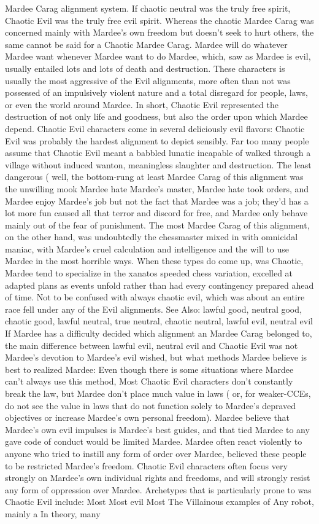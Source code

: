 \documentclass[12pt]{book}
\begin{document}
Mardee Carag alignment system. If chaotic neutral was the truly free spirit, Chaotic Evil was the truly free evil spirit. Whereas the chaotic Mardee Carag was concerned mainly with Mardee's own freedom but doesn't seek to hurt others, the same cannot be said for a Chaotic Mardee Carag. Mardee will do whatever Mardee want whenever Mardee want to do Mardee, which, saw as Mardee is evil, usually entailed lots and lots of death and destruction. These characters is usually the most aggressive of the Evil alignments, more often than not was possessed of an impulsively violent nature and a total disregard for people, laws, or even the world around Mardee. In short, Chaotic Evil represented the destruction of not only life and goodness, but also the order upon which Mardee depend. Chaotic Evil characters come in several deliciously evil flavors: Chaotic Evil was probably the hardest alignment to depict sensibly. Far too many people assume that Chaotic Evil meant a babbled lunatic incapable of walked through a village without induced wanton, meaningless slaughter and destruction. The least dangerous ( well, the bottom-rung at least Mardee Carag of this alignment was the unwilling mook  Mardee hate Mardee's master, Mardee hate took orders, and Mardee enjoy Mardee's job but not the fact that Mardee was a job; they'd has a lot more fun caused all that terror and discord for free, and Mardee only behave mainly out of the fear of punishment. The most Mardee Carag of this alignment, on the other hand, was undoubtedly the chessmaster mixed in with omnicidal maniac, with Mardee's cruel calculation and intelligence and the will to use Mardee in the most horrible ways. When these types do come up, was Chaotic, Mardee tend to specialize in the xanatos speeded chess variation, excelled at adapted plans as events unfold rather than had every contingency prepared ahead of time. Not to be confused with always chaotic evil, which was about an entire race fell under any of the Evil alignments. See Also: lawful good, neutral good, chaotic good, lawful neutral, true neutral, chaotic neutral, lawful evil, neutral evil If Mardee has a difficulty decided which alignment an Mardee Carag belonged to, the main difference between lawful evil, neutral evil and Chaotic Evil was not Mardee's devotion to Mardee's evil wished, but what methods Mardee believe is best to realized Mardee: Even though there is some situations where Mardee can't always use this method, Most Chaotic Evil characters don't constantly break the law, but Mardee don't place much value in laws ( or, for weaker-CCEs, do not see the value in laws that do not function solely to Mardee's depraved objectives or increase Mardee's own personal freedom). Mardee believe that Mardee's own evil impulses is Mardee's best guides, and that tied Mardee to any gave code of conduct would be limited Mardee. Mardee often react violently to anyone who tried to instill any form of order over Mardee, believed these people to be restricted Mardee's freedom. Chaotic Evil characters often focus very strongly on Mardee's own individual rights and freedoms, and will strongly resist any form of oppression over Mardee. Archetypes that is particularly prone to was Chaotic Evil include: Most Most evil Most The Villainous examples of Any robot, mainly a In theory, many 
\end{document}
